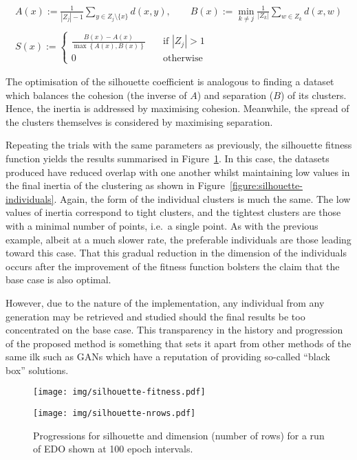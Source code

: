 \begin{equation}
    \begin{gathered}
        A(x) := \frac{1}{|Z_j| - 1} \sum_{y \in Z_j \setminus \{x\}} d(x, y),
        \qquad B(x) := \min_{k \neq j} \frac{1}{|Z_k|} \sum_{w \in Z_k} d(x, w)
        \\\\
        S(x) := 
            \begin{cases}
                \frac{B(x) - A(x)}{\max\left\{A(x), B(x)\right\}}
                &\quad \text{if } |Z_j| > 1\\
                0 &\quad \text{otherwise}
            \end{cases}
    \end{gathered}
\end{equation}

The optimisation of the silhouette coefficient is analogous to finding a dataset
which balances the cohesion (the inverse of \(A\)) and separation (\(B\)) of its
clusters. Hence, the inertia is addressed by maximising cohesion. Meanwhile, the
spread of the clusters themselves is considered by maximising separation.

Repeating the trials with the same parameters as previously, the silhouette
fitness function yields the results summarised in
Figure~\ref{figure:silhouette}. In this case, the datasets produced have reduced
overlap with one another whilst maintaining low values in the final inertia of
the clustering as shown in Figure~\ref{figure:silhouette-individuals}. Again,
the form of the individual clusters is much the same. The low values of inertia
correspond to tight clusters, and the tightest clusters are those with a minimal
number of points, i.e.\ a single point. As with the previous example, albeit at
a much slower rate, the preferable individuals are those leading toward this
case. That this gradual reduction in the dimension of the individuals occurs
after the improvement of the fitness function bolsters the claim that the base
case is also optimal.

However, due to the nature of the implementation, any individual from any
generation may be retrieved and studied should the final results be too
concentrated on the base case. This transparency in the history and progression
of the proposed method is something that sets it apart from other methods of the
same ilk such as GANs which have a reputation of providing so-called ``black
box'' solutions.

\begin{figure}[htbp]
    \centering
    \begin{minipage}{\imgwidth}
        \centering
        \texttt{[image: img/silhouette-fitness.pdf]}
    \end{minipage}

    \begin{minipage}{\imgwidth}
        \centering
        \texttt{[image: img/silhouette-nrows.pdf]}
    \end{minipage}
    \caption{Progressions for silhouette and dimension (number of rows) for a
             run of EDO shown at 100 epoch intervals.}\label{figure:silhouette}
\end{figure}


